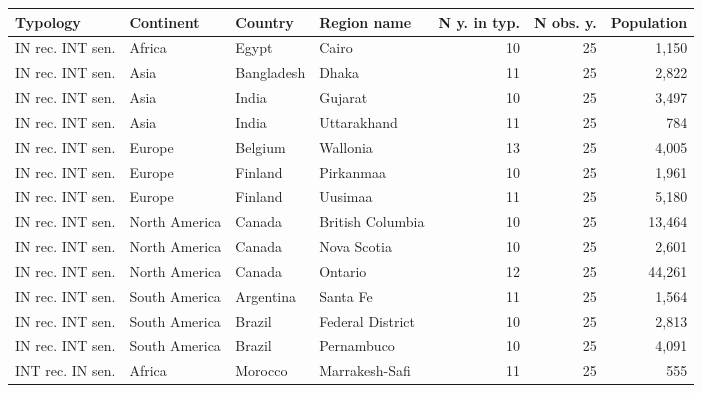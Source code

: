 \begin{tabular}{llllrrr}
\hline
 Typology         & Continent     & Country                & Region name        &   N y. in typ. &   N obs. y. &   Population \\
\hline
 IN rec. INT sen. & Africa        & Egypt                  & Cairo              &             10 &          25 &        1,150 \\
 IN rec. INT sen. & Asia          & Bangladesh             & Dhaka              &             11 &          25 &        2,822 \\
 IN rec. INT sen. & Asia          & India                  & Gujarat            &             10 &          25 &        3,497 \\
 IN rec. INT sen. & Asia          & India                  & Uttarakhand        &             11 &          25 &          784 \\
 IN rec. INT sen. & Europe        & Belgium                & Wallonia           &             13 &          25 &        4,005 \\
 IN rec. INT sen. & Europe        & Finland                & Pirkanmaa          &             10 &          25 &        1,961 \\
 IN rec. INT sen. & Europe        & Finland                & Uusimaa            &             11 &          25 &        5,180 \\
 IN rec. INT sen. & North America & Canada                 & British Columbia   &             10 &          25 &       13,464 \\
 IN rec. INT sen. & North America & Canada                 & Nova Scotia        &             10 &          25 &        2,601 \\
 IN rec. INT sen. & North America & Canada                 & Ontario            &             12 &          25 &       44,261 \\
 IN rec. INT sen. & South America & Argentina              & Santa Fe           &             11 &          25 &        1,564 \\
 IN rec. INT sen. & South America & Brazil                 & Federal District   &             10 &          25 &        2,813 \\
 IN rec. INT sen. & South America & Brazil                 & Pernambuco         &             10 &          25 &        4,091 \\
 INT rec. IN sen. & Africa        & Morocco                & Marrakesh-Safi     &             11 &          25 &          555 \\

\end{tabular}
